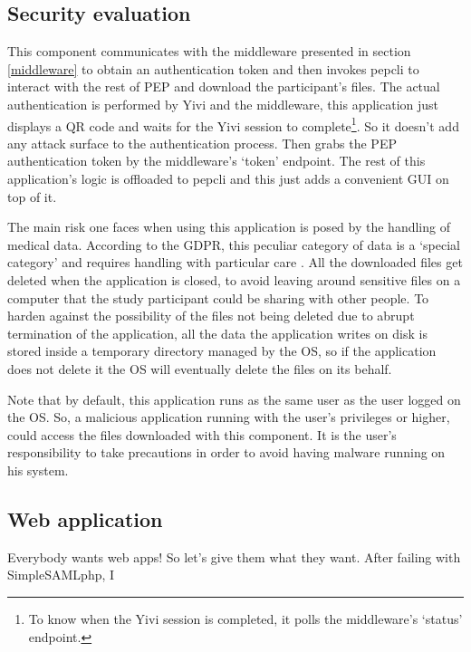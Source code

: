 \documentclass{report}
\begin{document}
\subsection{Security evaluation}
This component communicates with the middleware presented in section \ref{middleware} to obtain an authentication token and then invokes pepcli to interact with the rest of PEP and
download the participant's files. The actual authentication is performed by Yivi and the middleware, this application just displays a QR code and waits for the Yivi session to
complete\footnote{To know when the Yivi session is completed, it polls the middleware's \enquote*{status} endpoint.}. So it doesn't add any attack surface to the authentication
process. Then grabs the PEP authentication token by the middleware's \enquote*{token} endpoint. The rest of this application's logic is offloaded to pepcli and this just adds a
convenient GUI on top of it. \par
The main risk one faces when using this application is posed by the handling of medical data. According to the GDPR, this peculiar category of data is a \enquote*{special category}
and requires handling with particular care \cite{gdpr-art-9}. All the downloaded files get deleted when the application is closed, to avoid leaving around sensitive files on a
computer that the study participant could be sharing with other people. To harden against the possibility of the files not being deleted due to abrupt termination of the
application, all the data the application writes on disk is stored inside a temporary directory managed by the OS, so if the application does not delete it the OS will eventually
delete the files on its behalf. \par
Note that by default, this application runs as the same user as the user logged on the OS. So, a malicious application running with the user's privileges or higher, could access
the files downloaded with this component. It is the user's responsibility to take precautions in order to avoid having malware running on his system.


\iffalse

\subsection{Web application}
Everybody wants web apps! So let's give them what they want. After failing with SimpleSAMLphp, I 
\end{document}
